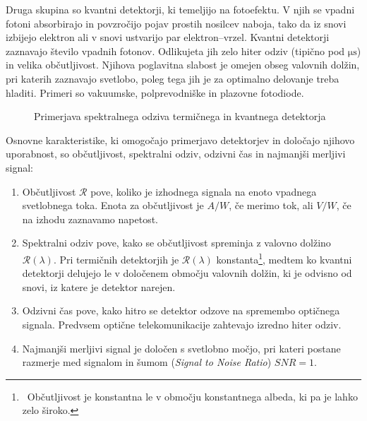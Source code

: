 Druga skupina so kvantni detektorji, ki temeljijo na fotoefektu.
V njih se vpadni fotoni absorbirajo in povzročijo pojav prostih nosilcev naboja, 
tako da iz snovi izbijejo elektron ali v snovi ustvarijo par elektron--vrzel. Kvantni 
detektorji zaznavajo število vpadnih fotonov. Odlikujeta jih zelo hiter odziv 
(tipično pod $\si{\micro\second}$)
in velika občutljivost. Njihova poglavitna slabost je omejen obseg valovnih dolžin,
pri katerih zaznavajo svetlobo, poleg tega jih je za optimalno delovanje treba 
hladiti. Primeri so vakuumske, polprevodniške in plazovne fotodiode.
\begin{figure}[ht]
\centering
\def\svgwidth{60truemm} 

\caption{Primerjava spektralnega odziva termičnega in kvantnega detektorja}
\label{fig:shemaTermKv}
\end{figure}

Osnovne karakteristike, ki omogočajo primerjavo detektorjev in določajo njihovo uporabnost,
so občutljivost, spektralni odziv, odzivni čas in najmanjši merljivi signal:

\begin{enumerate}
\item Občutljivost $\mathcal{R}$ pove, koliko je izhodnega signala 
na enoto vpadnega svetlobnega toka. Enota za občutljivost je $\si{A/W}$, če merimo tok, ali 
$\si{V/W}$, če na izhodu zaznavamo napetost. 
\item Spektralni odziv pove, kako se občutljivost spreminja z valovno dolžino $\mathcal{R}(\lambda)$.
Pri termičnih detektorjih je $\mathcal{R}(\lambda)$ konstanta\footnote{~Občutljivost je konstantna
le v območju konstantnega albeda, ki pa je lahko zelo široko.}, medtem ko kvantni detektorji 
delujejo le v določenem območju valovnih dolžin, ki je odvisno od snovi, 
iz katere je detektor narejen. 
\item Odzivni čas pove, kako hitro se detektor odzove na spremembo optičnega signala. Predvsem 
optične telekomunikacije zahtevajo izredno hiter odziv.
\item Najmanjši merljivi signal je določen s svetlobno močjo, pri kateri postane razmerje med 
signalom in šumom ({\it Signal to Noise Ratio}) $SNR = 1$. 
\end{enumerate}

